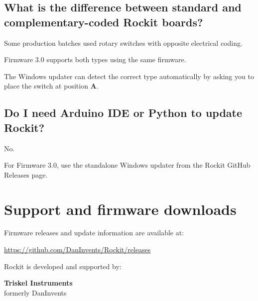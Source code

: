 \documentclass[11pt,a4paper]{article}
\begin{document}
\subsection*{What is the difference between standard and complementary-coded Rockit boards?}

Some production batches used rotary switches with opposite electrical coding.

Firmware 3.0 supports both types using the same firmware.

The Windows updater can detect the correct type automatically by asking you to place the switch at position \textbf{A}.

\subsection*{Do I need Arduino IDE or Python to update Rockit?}

No.

For Firmware 3.0, use the standalone Windows updater from the Rockit GitHub Releases page.

\section{Support and firmware downloads}

Firmware releases and update information are available at:

\begin{center}
\url{https://github.com/DanInvents/Rockit/releases}
\end{center}

Rockit is developed and supported by:

\begin{center}
\textbf{Triskel Instruments}\\
formerly DanInvents
\end{center}
\end{document}
